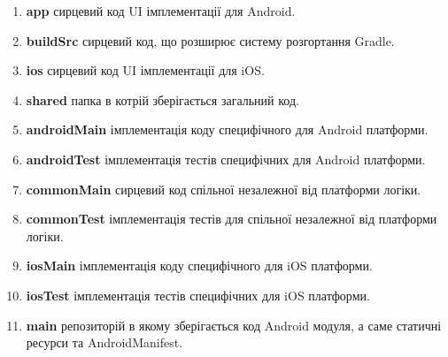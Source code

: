 \begin{enumerate}
    \item \textbf{app} сирцевий код UI імплементації для Android.
    \item \textbf{buildSrc} сирцевий код, що розширює систему розгортання Gradle.
    \item \textbf{ios} сирцевий код UI імплементації для iOS.
    \item \textbf{shared} папка в котрій зберігається загальний код.
    \item \textbf{androidMain} імплементація коду специфічного для Android платформи.
    \item \textbf{androidTest} імплементація тестів специфічних для Android платформи.
    \item \textbf{commonMain} сирцевий код спільної незалежної від платформи логіки.
    \item \textbf{commonTest} імплементація тестів для спільної незалежної від платформи логіки.
    \item \textbf{iosMain} імплементація коду специфічного для iOS платформи.
    \item \textbf{iosTest} імплементація тестів специфічних для iOS платформи.
    \item \textbf{main} репозиторій в якому зберігається код Android модуля, а саме статичні ресурси та AndroidManifest.
\end{enumerate}
